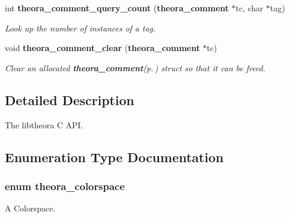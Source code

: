 \begin{CompactItemize}
int {\bf theora\_\-comment\_\-query\_\-count} ({\bf theora\_\-comment} $\ast$tc, char $\ast$tag)
\begin{CompactList}\small\item\em Look up the number of instances of a tag. \item\end{CompactList}\item 
void {\bf theora\_\-comment\_\-clear} ({\bf theora\_\-comment} $\ast$tc)
\begin{CompactList}\small\item\em Clear an allocated {\bf theora\_\-comment}{\rm (p.\,\pageref{structtheora__comment})} struct so that it can be freed. \item\end{CompactList}\end{CompactItemize}


\subsection{Detailed Description}
The libtheora C API. 



\subsection{Enumeration Type Documentation}
\subsubsection{\setlength{\rightskip}{0pt plus 5cm}enum {\bf theora\_\-colorspace}}\label{theora_8h_fdb3ecc6cbb1a6c346281db5c972d52d}


A Colorspace. 

